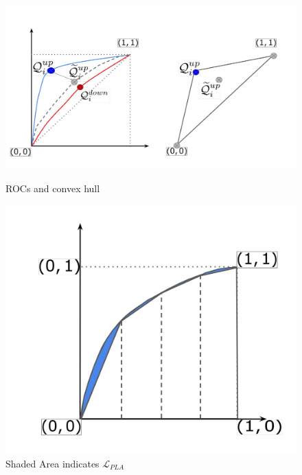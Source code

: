 \documentclass{article}
\begin{document}
\begin{figure}
    \centering
    \hspace{-1.5cm}
    \begin{minipage}{0.3\linewidth}
         \centering
         \includegraphics[scale = 0.07]{diagrams/Conv_Modified_2.jpg}
         \caption{ROCs and convex hull}
         \label{fig:conv}
     \end{minipage}
    \hspace{1.5cm}
     \begin{minipage}{0.3\linewidth}
         \centering
         \includegraphics[scale = 0.05]{diagrams/PLA_Modified_2.jpg}
         \caption{Shaded Area indicates $\mathcal{L}_{PLA}$}
         \label{fig:losslpa}
     \end{minipage}
     \begin{minipage}{0.3\linewidth}

\end{minipage}
\end{figure}
\end{document}
